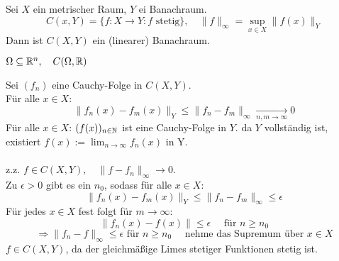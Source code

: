\begin{prop}
	Sei $X$ ein metrischer Raum, $Y$ ei Banachraum.
	\[ C(x, Y) = \{ f : X \rightarrow Y: f \text{ stetig} \}, \quad \| f \|_{\infty} = \sup_{x \in X} \| f(x) \|_{Y} \]
	Dann ist $C(X, Y)$ ein (linearer) Banachraum.
\end{prop}

\begin{beispiel*}
	$\Omega \subseteq \mathbb{R}^{n}, \quad C(\Omega, \mathbb{R})$
	\begin{beweis}
		Sei $(f_{n})$ eine Cauchy-Folge in $C(X, Y)$. \\
		Für alle $x \in X$:
		\[ \| f_{n}(x) - f_{m}(x) \|_{Y} \leq \| f_{n} - f_{m} \|_{\infty} \xrightarrow[n, m \rightarrow \infty]{} 0 \]
		Für alle $x \in X$: $(f(x))_{n \in \mathbb{N}}$ ist eine Cauchy-Folge in $Y$.
		da $Y$ vollständig ist, existiert $f(x) := \lim_{n \rightarrow \infty} f_{n}(x)$ in Y. \\ \\
		z.z. $f \in C(X, Y), \quad \| f - f_{n} \|_{\infty} \rightarrow 0$. \\
		Zu $\epsilon > 0$ gibt es ein $n_{0}$, sodass für alle $x \in X$:
		\[ \| f_{n}(x) - f_{m}(x) \|_{Y} \leq \| f_{n} - f_{m} \|_{\infty} \leq \epsilon \]
		Für jedes $x \in X$ fest folgt für $m \rightarrow \infty$:
		 \[ \| f_{n}(x) - f(x) \| \leq \epsilon \quad \text{ für } n \geq n_{0} \]
		 \[ \Rightarrow \| f_{n} - f \|_{\infty} \leq \epsilon \text{ für } n \geq n_{0} \quad  \text{ nehme das Supremum über } x \in X \]
		 $f \in C(X, Y)$, da der gleichmä{\ss}ige Limes stetiger Funktionen stetig ist.
	\end{beweis}
\end{beispiel*}

